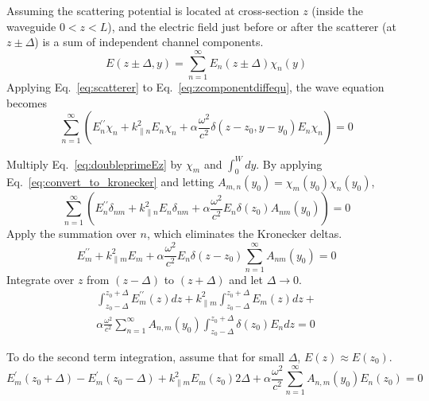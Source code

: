 Assuming the scattering potential is located at cross-section $z$ (inside the waveguide $0<z<L$), and the electric field just before or after the scatterer (at $z \pm \Delta$) is a sum of independent channel components.
\begin{equation}
E(z \pm \Delta, y) = \sum_{n=1}^\infty E_n(z \pm \Delta) \chi_n(y)
\end{equation}
Applying Eq.~\ref{eq:scatterer} to Eq.~\ref{eq:zcomponentdiffequ}, the wave equation becomes
\begin{equation}
\sum_{n=1}^\infty \left( E_n^{\prime\prime} \chi_n + k_{\parallel n}^2 E_n \chi_n + \alpha \frac{\omega^2}{c^2} \delta(z-z_0,y-y_0) E_n \chi_n \right) = 0
\label{eq:doubleprimeEz}
\end{equation}

Multiply Eq.~\ref{eq:doubleprimeEz} by $ \chi_m $ and $ \int_0^W dy $. By applying Eq.~\ref{eq:convert_to_kronecker} and letting $A_{m,n}(y_0)=\chi_m(y_0) \chi_n(y_0)$, 
\begin{equation}
\sum_{n=1}^\infty \left( E_n^{\prime\prime} \delta_{nm} + k_{\parallel n}^2 E_n \delta_{nm} + \alpha \frac{\omega^2}{c^2} E_n \delta(z_0) A_{nm}(y_0)  \right) = 0 
\end{equation}
Apply the summation over $n$, which eliminates the Kronecker deltas.
\begin{equation}
 E_m^{\prime\prime} + k_{\parallel m}^2 E_m + \alpha \frac{\omega^2}{c^2} E_n \delta(z-z_0) \sum_{n=1}^\infty A_{nm}(y_0) = 0
\end{equation}
Integrate over $z$ from $(z-\Delta)$ to $(z+\Delta)$ and let $\Delta\rightarrow0$.
\begin{equation}
\begin{gathered}
\int_{z_0-\Delta}^{z_0+\Delta} E_m^{\prime\prime}(z) dz + k_{\parallel m} ^2 \int_{z_0-\Delta}^{z_0+\Delta} 
E_m(z) dz +\\ \alpha \frac{\omega^2}{c^2} \sum_{n=1}^\infty A_{n,m}(y_0) \int_{z_0-\Delta}^{z_0+\Delta} \delta(z_0) E_n dz = 0
\end{gathered}
\end{equation}

To do the second term integration, assume that for small $\Delta$, $E(z) \approx E(z_0)$.  
\begin{equation}
E_m^{\prime}(z_0 + \Delta) - E_m^{\prime}(z_0 - \Delta) + k_{\parallel m}^2 E_m(z_0) 2 \Delta + \alpha \frac{\omega^2}{c^2} \sum_{n=1}^\infty A_{n,m}(y_0) E_n(z_0) = 0
\end{equation}

